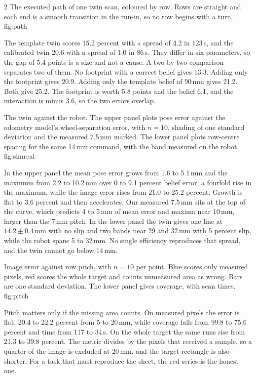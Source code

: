 \documentclass[a4paper,10pt]{article}
\begin{document}
\begin{multicols*}{2}
%
{The executed path of one twin scan, coloured by row. Rows are straight and each
end is a smooth transition in the run-in, so no row begins with a turn.}
{fig:path}

The template twin scores 15.2 percent with a spread of 4.2 in 123\,s, and the
calibrated twin 20.6 with a spread of 1.0 in 86\,s. They differ in six parameters,
so the gap of 5.4 points is a size and not a cause. A two by two comparison
separates two of them. No footprint with a correct belief gives 13.3.
Adding only the footprint gives 20.9. Adding only the template belief of 90\,mm
gives 21.2. Both give 25.2. The footprint is worth 5.8 points and the belief 6.1,
and the interaction is minus 3.6, so the two errors overlap.


%
{The twin against the robot. The upper panel plots pose error against the
odometry model's wheel-separation error, with $n=10$, shading of one standard
deviation and the measured 7.5\,mm marked. The lower panel plots row-centre
spacing for the same 14\,mm command, with the band measured on the robot.}
{fig:simreal}

In the upper panel the mean pose error grows from 1.6 to 5.1\,mm and the maximum
from 2.2 to 10.2\,mm over 0 to 9.1 percent belief error, a fourfold rise in the
maximum, while the image error rises from 21.0 to 25.2 percent. Growth is flat to
3.6 percent and then accelerates. Our measured 7.5\,mm sits at the top of the
curve, which predicts 4 to 5\,mm of mean error and maxima near 10\,mm, larger than
the 7\,mm pitch. In the lower panel the twin gives one line at $14.2\pm0.4$\,mm
with no slip and two bands near 29 and 32\,mm with 5 percent slip, while the robot
spans 5 to 32\,mm. No single efficiency reproduces that spread, and the twin
cannot go below 14\,mm.

%
{Image error against row pitch, with $n=10$ per point. Blue scores only measured
pixels, red scores the whole target and counts unmeasured area as wrong. Bars are
one standard deviation. The lower panel gives coverage, with scan times.}
{fig:pitch}

Pitch matters only if the missing area counts. On measured pixels the error is
flat, 20.4 to 22.2 percent from 5 to 20\,mm, while coverage falls from 99.8 to
75.6 percent and time from 117 to 34\,s. On the whole target the same runs rise
from 21.3 to 39.8 percent. The metric divides by the pixels that received a
sample, so a quarter of the image is excluded at 20\,mm, and the target rectangle
is also shorter. For a task that must reproduce the sheet, the red series is the
honest one.


\end{multicols*}
\end{document}
